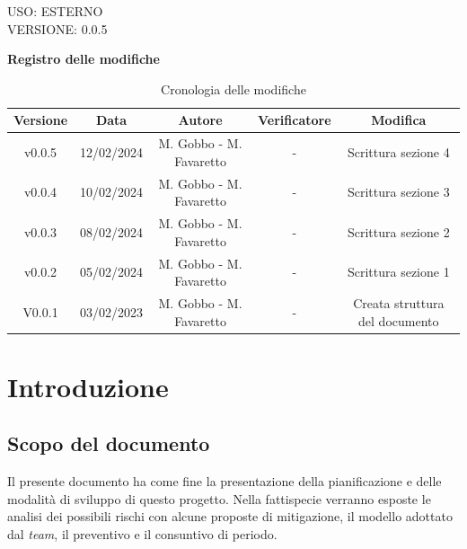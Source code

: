 \documentclass[5pt]{article}
\begin{document}
\begin{flushright}
    \begin{spacing}{1}
        USO: ESTERNO\\
        VERSIONE: 0.0.5\\
    \end{spacing}
\end{flushright}


\restoregeometry

\pagebreak

\textbf{\Large Registro delle modifiche}
\begin{table}[ht]
\centering
\begin{tabular}{|c|c|c|c|c|}
\hline
\textbf{Versione} & \textbf{Data} & \textbf{Autore} & \textbf{Verificatore} & \textbf{Modifica} \\
\hline
v0.0.5 & 12/02/2024 & M. Gobbo - M. Favaretto & - & Scrittura sezione 4 \\
\hline
v0.0.4 & 10/02/2024 & M. Gobbo - M. Favaretto & - & Scrittura sezione 3 \\
\hline
v0.0.3 & 08/02/2024 & M. Gobbo - M. Favaretto & - & Scrittura sezione 2 \\
\hline
v0.0.2 & 05/02/2024 & M. Gobbo - M. Favaretto & - & Scrittura sezione 1 \\
\hline
V0.0.1 & 03/02/2023 & M. Gobbo - M. Favaretto & - & Creata struttura del documento \\
\hline
\end{tabular}
\caption{Cronologia delle modifiche}
\label{tab:conference}
\end{table}

\pagebreak
\tableofcontents
\pagebreak

\section{Introduzione}
\subsection{Scopo del documento}
Il presente documento ha come fine la presentazione della pianificazione e delle modalità di sviluppo di questo progetto. 
Nella fattispecie verranno esposte le analisi dei possibili rischi con alcune proposte di mitigazione, il modello adottato dal \textit{team}, 
il preventivo e il consuntivo di periodo.
\end{document}
